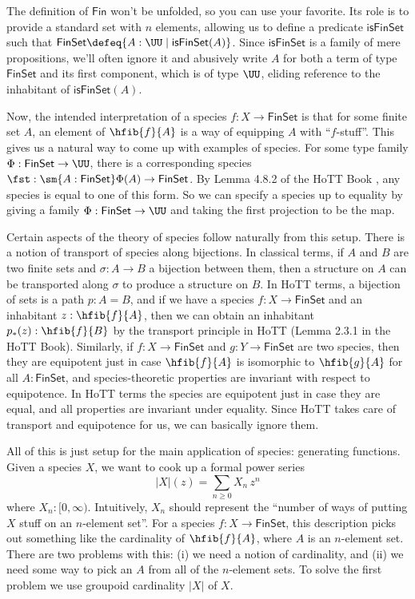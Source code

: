 \documentclass[fleqn]{article}
\newcommand{\gf}[1]{\abs{#1}\!(z)}
\newcommand{\fin}{\mathsf{Fin}}
\newcommand{\finset}{\mathsf{FinSet}}
\newcommand{\isfinset}{\mathsf{isFinSet}}
\newcommand{\abs}[1]{\left\lvert #1 \right\rvert}
\theoremstyle{theorem}
\theoremstyle{definition}
\begin{document}
The definition of $\fin$ won't be unfolded, so you can use your favorite.  Its
role is to provide a standard set with $n$ elements, allowing us to define a
predicate $\isfinset$ such that $\finset \defeq \{A : \UU \mid \isfinset(A)\}$.
Since $\isfinset$ is a family of mere propositions, we'll often ignore it and
abusively write $A$ for both a term of type $\finset$ and its first component,
which is of type $\UU$, eliding reference to the inhabitant of $\isfinset(A)$.

Now, the intended interpretation of a species $f : X \to \finset$ is that for
some finite set $A$, an element of $\hfib{f}{A}$ is a way of equipping $A$ with
``$f$-stuff''.  This gives us a natural way to come up with examples of
species.  For some type family $\Phi : \finset \to \UU$, there is a
corresponding species $\fst : \sm{A : \finset}\Phi(A) \to \finset$.  By Lemma
4.8.2 of the \ac{HoTT} Book , any species is equal to one
of this form.  So we can specify a species up to equality by giving a family
$\Phi : \finset \to \UU$ and taking the first projection to be the map.

Certain aspects of the theory of species follow naturally from this setup.
There is a notion of transport of species along bijections.  In classical
terms, if $A$ and $B$ are two finite sets and $\sigma : A \to B$ a bijection
between them, then a structure on $A$ can be transported along $\sigma$ to
produce a structure on $B$.  In \ac{HoTT} terms, a bijection of sets is a path
$p : A = B$, and if we have a species $f : X \to \finset$ and an inhabitant
$z : \hfib{f}{A}$, then we can obtain an inhabitant $p_{*}(z) : \hfib{f}{B}$ by
the transport principle in \ac{HoTT} (Lemma 2.3.1 in the \ac{HoTT} Book).
Similarly, if $f : X \to \finset$ and $g : Y \to \finset$ are two species, then
they are equipotent just in case $\hfib{f}{A}$ is isomorphic to $\hfib{g}{A}$
for all $A : \finset$, and species-theoretic properties are invariant with
respect to equipotence.  In \ac{HoTT} terms the species are equipotent just in
case they are equal, and all properties are invariant under equality.  Since
\ac{HoTT} takes care of transport and equipotence for us, we can basically
ignore them.

All of this is just setup for the main application of species: generating
functions.  Given a species $X$, we want to cook up a formal power series
\[
  \gf{X}
  =
  \sum_{n\geq0} X_{n}\, z^{n}
\]
where $X_{n} : [0, \infty)$.  Intuitively, $X_{n}$ should represent the
``number of ways of putting $X$ stuff on an $n$-element set''.  For a species
$f : X \to \finset$, this description picks out something like the cardinality
of $\hfib{f}{A}$, where $A$ is an $n$-element set.  There are two problems with
this: (i) we need a notion of cardinality, and (ii) we need some way to pick an
$A$ from all of the $n$-element sets.  To solve the first problem we use
groupoid cardinality $\abs{X}$ of $X$.
\end{document}
